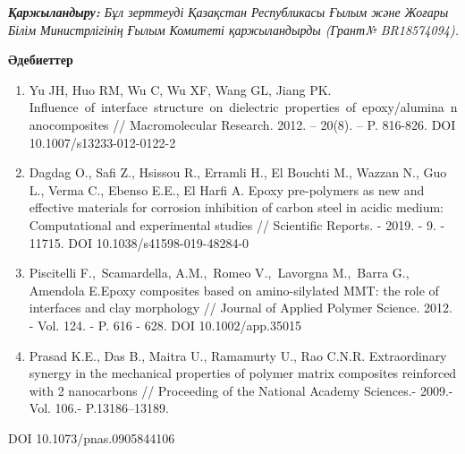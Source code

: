 \emph{{\bfseries Қаржыландыру:} Бұл зерттеуді Қазақстан Республикасы Ғылым
және Жоғары Білім Министрлігінің Ғылым Комитеті қаржыландырды (Грант№
BR18574094).}

{\bfseries Әдебиеттер}

\begin{enumerate}
\def\labelenumi{\arabic{enumi}.}
\item
  Yu JH, Huo RM, Wu C, Wu XF, Wang GL, Jiang PK.
  Influence~of~interface~structure~on~dielectric~properties~of~epoxy/alumina~nanocomposites
  // Macromolecular Research. 2012. -- 20(8). -- P. 816-826. DOI
  10.1007/s13233-012-0122-2
\item
  Dagdag O., Safi Z., Hsissou R., Erramli H., El Bouchti M., Wazzan N.,
  Guo L., Verma C., Ebenso E.E., El Harfi A. Epoxy pre-polymers as new
  and effective materials for corrosion inhibition of carbon steel in
  acidic medium: Computational and experimental studies // Scientific
  Reports. - 2019. - 9. - 11715. DOI 10.1038/s41598-019-48284-0
\item
  Piscitelli F.,~Scamardella, A.M.,~Romeo V.,~Lavorgna M.,~Barra G.,
  Amendola E.Epoxy composites based on amino-silylated MMT: the role of
  interfaces and clay morphology // Journal of Applied Polymer Science.
  2012. - Vol. 124. - P. 616 - 628. DOI 10.1002/app.35015
\item
  Prasad K.E., Das B., Maitra U., Ramamurty U., Rao C.N.R. Extraordinary
  synergy in the mechanical properties of polymer matrix composites
  reinforced with 2 nanocarbons // Proceeding of the National Academy
  Sciences.- 2009.- Vol. 106.- P.13186--13189.
\end{enumerate}

DOI 10.1073/pnas.0905844106

